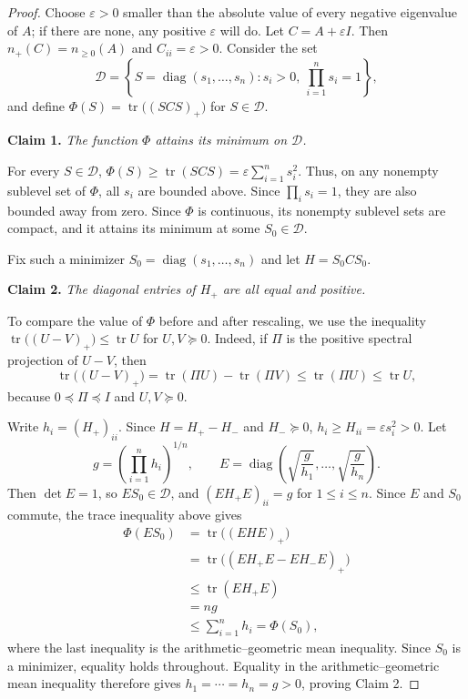 \documentclass[11pt]{article}
\numberwithin{equation}{section}
\theoremstyle{definition}
\theoremstyle{remark}
\DeclareMathOperator{\tr}{tr}
\DeclareMathOperator{\diag}{diag}
\begin{document}
\begin{proof}
Choose $\varepsilon>0$ smaller than the absolute value of every
negative eigenvalue of $A$; if there are none, any positive
$\varepsilon$ will do. Let $C=A+\varepsilon I$. Then
$n_+(C)=n_{\geq0}(A)$ and $C_{ii}=\varepsilon>0$.
Consider the set
\[
 \mathcal D
 =
 \left\{
 S=\diag(s_1,\ldots,s_n):
 s_i>0,\ \prod_{i=1}^n s_i=1
 \right\},
\]
and define $\Phi(S)=\tr\bigl((SCS)_+\bigr)$ for $S\in\mathcal D$.

\smallskip\noindent
\textbf{Claim 1.}
\emph{The function $\Phi$ attains its minimum on $\mathcal D$.}

For every $S\in\mathcal D$,
$\Phi(S)\geq\tr(SCS)=\varepsilon\sum_{i=1}^n s_i^2$.
Thus, on any nonempty sublevel set of $\Phi$, all $s_i$ are
bounded above. Since $\prod_i s_i=1$, they are also bounded
away from zero. Since $\Phi$ is continuous, its nonempty sublevel
sets are compact, and it attains its minimum at some $S_0\in\mathcal D$.

Fix such a minimizer $S_0=\diag(s_1,\ldots,s_n)$ and let
$H=S_0CS_0$.

\smallskip\noindent
\textbf{Claim 2.}
\emph{The diagonal entries of $H_+$ are all equal and positive.}

To compare the value of $\Phi$ before and after rescaling, we use
the inequality $\tr\bigl((U-V)_+\bigr)\leq\tr U$ for $U,V\succeq0$.
Indeed, if $\Pi$ is the positive spectral projection of $U-V$, then
\[
 \tr\bigl((U-V)_+\bigr)
 =\tr(\Pi U)-\tr(\Pi V)
 \leq\tr(\Pi U)\leq\tr U,
\]
because $0\preceq\Pi\preceq I$ and $U,V\succeq0$.

Write $h_i=(H_+)_{ii}$. Since $H=H_+-H_-$ and $H_-\succeq0$,
$h_i\geq H_{ii}=\varepsilon s_i^2>0$.
Let
\[
 g=\left(\prod_{i=1}^n h_i\right)^{1/n},
 \qquad
 E=\diag\left(
 \sqrt{\frac{g}{h_1}},\ldots,\sqrt{\frac{g}{h_n}}
 \right).
\]
Then $\det E=1$, so $ES_0\in\mathcal D$, and
$(EH_+E)_{ii}=g$ for $1\leq i\leq n$.
Since $E$ and $S_0$ commute, the trace inequality above gives
\[
 \begin{aligned}
 \Phi(ES_0)
 &=\tr\bigl((EHE)_+\bigr)\\
 &=\tr\bigl((EH_+E-EH_-E)_+\bigr)\\
 &\leq\tr(EH_+E)\\
 &=ng\\
 &\leq\sum_{i=1}^n h_i
 =\Phi(S_0),
 \end{aligned}
\]
where the last inequality is the arithmetic--geometric mean
inequality. Since $S_0$ is a minimizer, equality holds throughout.
Equality in the arithmetic--geometric mean inequality therefore gives
$h_1=\cdots=h_n=g>0$, proving Claim 2.


\end{proof}
\end{document}

